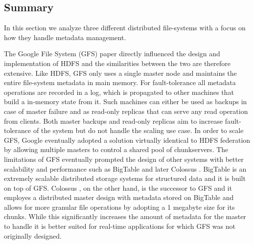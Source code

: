 \subsection{Summary}
In this section we analyze three different distributed file-systems with a focus on how they handle metadata management.

The Google File System (GFS) paper \cite{DBLP:conf/sosp/GhemawatGL03} directly influenced the design and implementation of HDFS and the similarities between the two are therefore extensive.
Like HDFS, GFS only uses a single master node and maintains the entire file-system metadata in main memory.
For fault-tolerance all metadata operations are recorded in a log, which is propagated to other machines that build a in-memory state from it.
Such machines can either be used as backups in case of master failure and as read-only replicas that can serve any read operation from clients.
Both master backups and read-only replicas aim to increase fault-tolerance of the system but do not handle the scaling use case.
In order to scale GFS, Google eventually adopted a solution virtually identical to HDFS federation by allowing multiple masters to control a shared pool of chunkservers.
The limitations of GFS eventually prompted the design of other systems with better scalability and performance such as BigTable and later Colossus \cite{DBLP:journals/cacm/McKusickQ10}.
BigTable \cite{DBLP:conf/osdi/ChangDGHWBCFG06} is an extremely scalable distributed storage systems for structured data and it is built on top of GFS.
Colossus \cite{DBLP:journals/cacm/McKusickQ10}, on the other hand, is the successor to GFS and it employes a distributed master design with metadata stored on BigTable and allows for more granular file operations by adopting a 1 megabyte size for its chunks.
While this significantly increases the amount of metadata for the master to handle it is better suited for real-time applications for which GFS was not originally designed.
